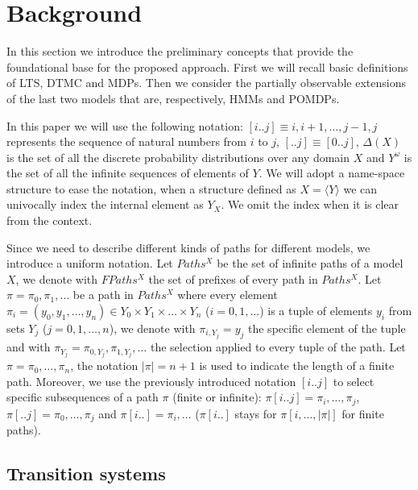 
\section{Background} %
\label{sec:preliminaries}

In this section we introduce the preliminary concepts that provide the foundational base for the proposed approach. First we will recall basic definitions of \ac{LTS}, \ac{DTMC} and \acp{MDP}. Then we consider the partially observable extensions of the last two models that are, respectively, \acp{HMM} and \acp{POMDP}.

In this paper we will use the following notation: $[i..j] \equiv i,i+1,\dots,j-1,j$ represents the sequence of natural numbers from $i$ to $j$, $[..j] \equiv [0..j]$, $\Delta(X)$ is the set of all the discrete probability distributions over any domain $X$ and $Y^\omega$ is the set of all the infinite sequences of elements of $Y$. We will adopt a name-space structure to ease the notation, when a structure defined as $X = \langle Y \rangle$ we can univocally index the internal element as $Y_X$. We omit the index when it is clear from the context.

Since we need to describe different kinds of paths for different models, we introduce a uniform notation. Let $Paths^X$ be the set of infinite paths of a model $X$, we denote with $FPaths^X$ the set of prefixes of every path in $Paths^X$. Let $\pi = \pi_0, \pi_1, \dots$ be a path in $Paths^X$ where every element $\pi_i = (y_0,y_1,\dots,y_n) \in Y_0 \times Y_1 \times \dots \times Y_n$ ($i = 0,1,\dots$) is a tuple of elements $y_i$ from sets $Y_j$ ($j=0,1,\dots,n$), we denote with $\pi_{i,Y_j} = y_j$ the specific element of the tuple and with $\pi_{Y_j} = \pi_{0,Y_j},\pi_{1,Y_j},\dots$ the selection applied to every tuple of the path. Let $\pi = \pi_0,\dots,\pi_n$, the notation $|\pi| = n+1$ is used to indicate the length of a finite path. Moreover, we use the previously introduced notation $[i..j]$ to select specific subsequences of a path $\pi$ (finite or infinite): $\pi[i..j] = \pi_i,\dots,\pi_j$, $\pi[..j] = \pi_0,\dots,\pi_j$ and $\pi[i..] = \pi_i,\dots$ ($\pi[i..]$ stays for $\pi[i,\dots,|\pi|]$ for finite paths).

\subsection*{Transition systems} %
\label{sub:transition_systems}

